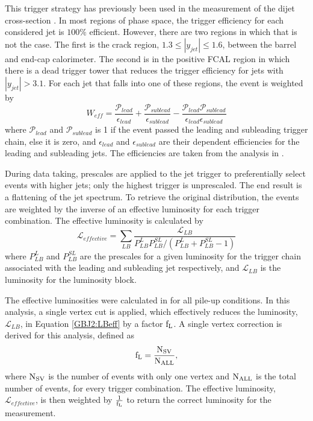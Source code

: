 This trigger strategy has previously been used in the measurement of the dijet cross-section \cite{ref:Dijet}.
In most regions of phase space, the trigger efficiency for each considered jet is $100\%$ efficient.
However, there are two regions in which that is not the case.
The first is the crack region, $1.3\le|y_{jet}|\le1.6$, between the barrel and end-cap calorimeter.
The second is in the positive FCAL region in which there is a dead trigger tower that reduces the trigger efficiency for jets with $|y_{jet}|>3.1$.
For each jet that falls into one of these regions, the event is weighted by 
\begin{equation}
W_{eff}= \frac{\mathcal{P}_{lead}}{\epsilon_{lead}} + \frac{\mathcal{P}_{sublead}}{\epsilon_{sublead}} -\frac{\mathcal{P}_{lead}\mathcal{P}_{sublead}}{\epsilon_{lead}\epsilon_{sublead}}
\label{GBJ2:Eff}
\end{equation}
where $\mathcal{P}_{lead}$ and $\mathcal{P}_{sublead}$ is 1 if the event passed the leading and subleading trigger chain, else it is zero, and $\epsilon_{lead}$ and $\epsilon_{sublead}$ are their \pt{} dependent efficiencies for the leading and subleading jets.
The efficiencies are taken from the analysis in \cite{ref:Dijet}.

During data taking, prescales are applied to the jet trigger to preferentially select events with higher \pt{} jets; only the highest \pt{} trigger is unprescaled.
The end result is a flattening of the jet \pt{} spectrum.
To retrieve the original distribution, the events are weighted by the inverse of an effective luminosity for each trigger combination.
The  effective luminosity is calculated by
\begin{equation}
\mathcal{L}_{effective} = \sum_{LB} \frac{\mathcal{L}_{LB}}{P_{LB}^L P_{LB}^{SL}/(P_{LB}^L + P_{LB}^{SL} -1)}
\label{GBJ2:LBeff}
\end{equation}
where $P_{LB}^L$ and $P_{LB}^{SL}$ are the prescales for a given luminosity for the trigger chain associated with the leading and subleading jet respectively, and $\mathcal{L}_{LB}$ is the luminosity for the luminosity block. 

The effective luminosities were calculated in \cite{ref:Dijet} for all pile-up conditions.
In this analysis, a single vertex cut is applied, which effectively reduces the luminosity, $\mathcal{L}_{LB}$, in Equation \ref{GBJ2:LBeff} by a factor $\rm f_{L}$.
A single vertex correction is derived for this analysis, defined as 
\begin{equation}
\rm f_{L} = \frac{N_{SV}}{N_{ALL}},
\label{GBJ2:SVCorrection}
\end{equation}
where $\rm N_{SV}$ is the number of events with only one vertex and  $\rm N_{ALL}$ is the total number of events, for every trigger combination.
The effective luminosity, $\mathcal{L}_{effective}$, is then weighted by $\frac{1}{\rm f_{L}}$ to return the correct luminosity for the measurement.

